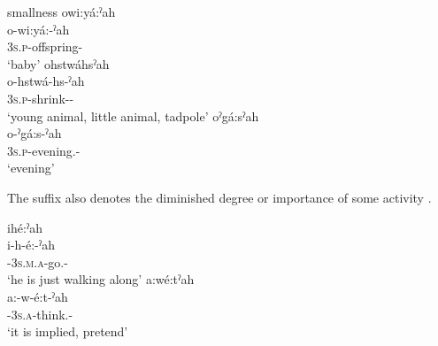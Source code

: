 \ea\label{ex:ahex2} smallness
\ea owi:yá:ˀah\\\label{ex:ahex2a}
\gll o-wi:yá:-ˀah\\
 \textsc{3s.p}-offspring-{\diminutive}\\
\glt `baby'
\newpage
\ex ohstwáhsˀah\\\label{ex:ahex2b}
\gll o-hstwá-hs-ˀah\\
 \textsc{3s.p}-shrink-{\habitual}-{\diminutive}\\
\glt `young animal, little animal, tadpole'
\ex oˀgá:sˀah\\\label{ex:ahex2e}
\gll o-ˀgá:s-ˀah\\
 \textsc{3s.p}-evening.{\stative}-{\diminutive}\\
\glt `evening'
\z
\z

The  {\diminutive} suffix also denotes the diminished degree or importance of some activity .

\ea\label{ex:ahex4}
\ea ihé:ˀah\\
\gll i-h-é:-ˀah\\
 {\prothetic}-\textsc{3s.m.a}-go.{\stative}-{\diminutive}\\
\glt `he is just walking along'
\ex a:wé:tˀah\\
\gll a:-w-é:t-ˀah\\
 {\indefinite}-\textsc{3s.a}-think.{\causative}-{\diminutive}\\
\glt `it is implied, pretend'
\z
\z

